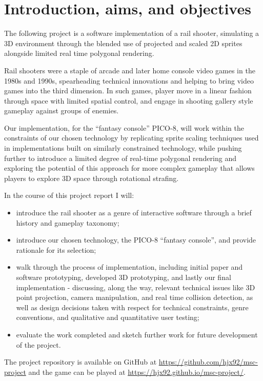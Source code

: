\documentclass[11pt]{article}
\begin{document}
\section{Introduction, aims, and objectives}

The following project is a software implementation of a rail shooter, simulating a 3D 
environment through the blended use of projected and scaled 2D sprites alongside
limited real time polygonal rendering.

Rail shooters were a staple of arcade and later home console video games in the 1980s and
1990s, spearheading technical innovations and helping to bring video games into the third
dimension. In such games, player move in a linear fashion through space with limited
spatial control, and engage in shooting gallery style gameplay against groups of enemies.

Our implementation, for the ``fantasy console'' PICO-8, will work within the constraints of
our chosen technology by replicating sprite scaling techniques used in implementations built
on similarly constrained technology, while pushing further to introduce a limited degree of
real-time polygonal rendering and exploring the potential of this approach for more complex
gameplay that allows players to explore 3D space through rotational strafing.

In the course of this project report I will:

\begin{itemize}
   \item introduce the rail shooter as a genre of interactive software through a brief history and gameplay taxonomy;
   \item introduce our chosen technology, the PICO-8 ``fantasy console'', and provide rationale for its selection;
   \item walk through the process of implementation, including initial paper and software prototyping, developed 3D 
   prototyping, and lastly our final implementation - discussing, along the way, relevant technical issues like 
   3D point projection, camera manipulation, and real time collision detection, as well as design decisions taken
   with respect for technical constraints, genre conventions, and qualitative and quantitative user testing;
   \item evaluate the work completed and sketch further work for future development of the project.
\end{itemize}

The project repository is available on GitHub at \url{https://github.com/hjx92/msc-project} and the game can
be played at \url{https://hjx92.github.io/msc-project/}.
\end{document}
